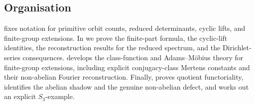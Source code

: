 \subsection{Organisation}

 fixes notation for primitive orbit counts,
reduced determinants, cyclic lifts, and finite-group extensions. In
 we prove the finite-part formula, the cyclic-lift
identities, the reconstruction results for the reduced spectrum, and
the Dirichlet-series consequences. 
develops the class-function and Adams--M\"obius theory for finite-group
extensions, including explicit conjugacy-class Mertens constants and
their non-abelian Fourier reconstruction. Finally,
 proves quotient functoriality, identifies the
abelian shadow and the genuine non-abelian defect, and works out an
explicit \(S_3\)-example.
